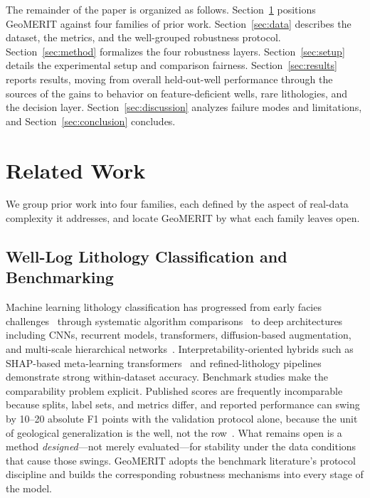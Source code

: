 \documentclass[bdcc,article,submit,pdftex,moreauthors]{Definitions/mdpi}
\begin{document}
The remainder of the paper is organized as follows. Section~\ref{sec:related} positions
GeoMERIT against four families of prior work. Section~\ref{sec:data} describes the dataset,
the metrics, and the well-grouped robustness protocol. Section~\ref{sec:method} formalizes
the four robustness layers. Section~\ref{sec:setup} details the experimental setup and
comparison fairness. Section~\ref{sec:results} reports results, moving from overall
held-out-well performance through the sources of the gains to behavior on feature-deficient
wells, rare lithologies, and the decision layer. Section~\ref{sec:discussion} analyzes failure
modes and limitations, and
Section~\ref{sec:conclusion} concludes.

\section{Related Work}
\label{sec:related}
We group prior work into four families, each defined by the aspect of real-data complexity
it addresses, and locate GeoMERIT by what each family leaves open.

\subsection{Well-Log Lithology Classification and Benchmarking}
Machine learning lithology classification has progressed from early facies
challenges~\cite{hall2016facies} through systematic algorithm
comparisons~\cite{merembayev2021,dev2019formation} to deep architectures including CNNs,
recurrent models, transformers, diffusion-based augmentation, and multi-scale hierarchical
networks~\cite{wang2024dnnlitho,chen2025geological,zhao2025diffusion,zhan2025mchgeo}.
Interpretability-oriented hybrids such as SHAP-based meta-learning
transformers~\cite{sun2024shapmeta,lundberg2017shap} and refined-lithology
pipelines~\cite{shi2023refined} demonstrate strong within-dataset accuracy. Benchmark studies
make the comparability problem explicit. Published scores are frequently incomparable because
splits, label sets, and metrics differ, and reported performance can swing by 10--20 absolute
F1 points with the validation protocol alone, because the unit of geological generalization
is the well, not the row~\cite{carvalho2026benchmark,rosenblatt2024}. What remains open is a
method \emph{designed}---not merely evaluated---for stability under the data conditions that
cause those swings. GeoMERIT adopts the benchmark literature's protocol discipline and builds
the corresponding robustness mechanisms into every stage of the model.
\end{document}
